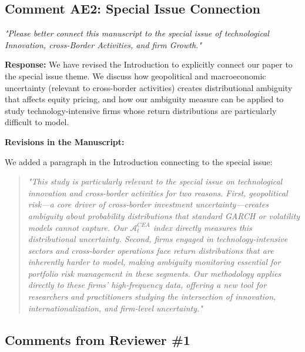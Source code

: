 \documentclass[12pt]{article}
\begin{document}
\subsection*{Comment AE2: Special Issue Connection}
\textit{"Please better connect this manuscript to the special issue of technological Innovation, cross-Border Activities, and firm Growth."}

\begin{highlightbox}
\textbf{Response:} We have revised the Introduction to explicitly connect our paper to the special issue theme. We discuss how geopolitical and macroeconomic uncertainty (relevant to cross-border activities) creates distributional ambiguity that affects equity pricing, and how our ambiguity measure can be applied to study technology-intensive firms whose return distributions are particularly difficult to model.
\end{highlightbox}

\begin{highlightbox}
\textbf{Revisions in the Manuscript:}

We added a paragraph in the Introduction connecting to the special issue:
\vspace{0.2cm}
\begin{quote}
\itshape "This study is particularly relevant to the special issue on technological innovation and cross-border activities for two reasons. First, geopolitical risk---a core driver of cross-border investment uncertainty---creates ambiguity about probability distributions that standard GARCH or volatility models cannot capture. Our $\mathcal{A}^{CEA}_t$ index directly measures this distributional uncertainty. Second, firms engaged in technology-intensive sectors and cross-border operations face return distributions that are inherently harder to model, making ambiguity monitoring essential for portfolio risk management in these segments. Our methodology applies directly to these firms' high-frequency data, offering a new tool for researchers and practitioners studying the intersection of innovation, internationalization, and firm-level uncertainty."
\end{quote}
\end{highlightbox}

\subsection*{Comments from Reviewer \#1}
\end{document}
